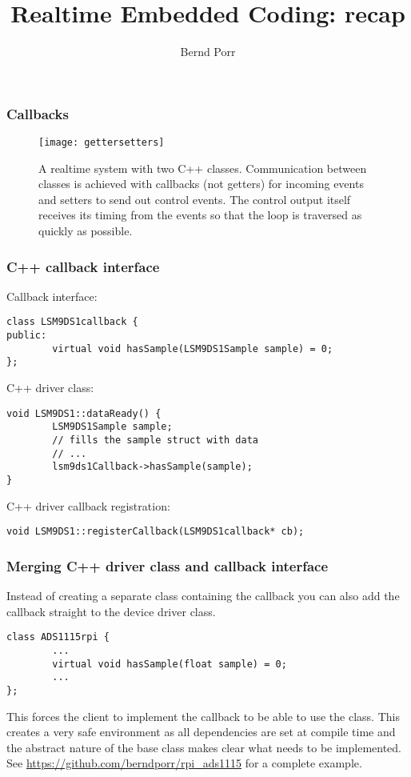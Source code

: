 \documentclass[xcolor=dvipsnames]{beamer}
\title{Realtime Embedded Coding: recap}
\date{}
\author{Bernd Porr}
\begin{document}
\begin{frame}
\titlepage
\end{frame}

\begin{frame}[fragile]
\frametitle{Callbacks}
\begin{figure}[!hbt]
    \begin{center}
    \mbox{\texttt{[image: gettersetters]}}
    \end{center}
    A realtime system with two C++ classes. Communication
      between classes is achieved with callbacks (not getters) for incoming events
      and setters to send out control events. The control output itself
      receives its timing from the events so that the loop is traversed
      as quickly as possible.
    \end{figure}
\end{frame}


\begin{frame}[fragile]
    \frametitle{C++ callback interface}

Callback interface:
\begin{verbatim}
class LSM9DS1callback {
public:
        virtual void hasSample(LSM9DS1Sample sample) = 0;
};
\end{verbatim}

C++ driver class:
\begin{verbatim}
void LSM9DS1::dataReady() {
        LSM9DS1Sample sample;
        // fills the sample struct with data
        // ...
        lsm9ds1Callback->hasSample(sample);
}
\end{verbatim}

C++ driver callback registration:
\begin{verbatim}
void LSM9DS1::registerCallback(LSM9DS1callback* cb);
\end{verbatim}

\end{frame}



\begin{frame}[fragile]
    \frametitle{Merging C++ driver class and callback interface}
Instead of creating a separate class containing the callback you
can also add the callback straight to the device driver class.
\begin{verbatim}
class ADS1115rpi {
        ...
        virtual void hasSample(float sample) = 0;
        ...
};
\end{verbatim}
This forces the client to implement the callback to be able to use
the class. This creates a very safe environment as all dependencies
are set at compile time and the abstract nature of the base class
makes clear what needs to be implemented.
See
\url{https://github.com/berndporr/rpi_ads1115} for a complete example.
\end{frame}
\end{document}
